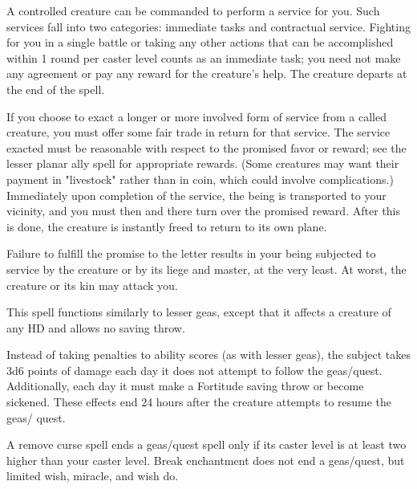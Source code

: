 \begin{multicols}{2}
\begin{small}
{\smallskip\noindent A controlled creature can be commanded to perform a service for you. Such services fall into two categories: immediate tasks and contractual service. Fighting for you in a single battle or taking any other actions that can be accomplished within 1 round per caster level counts as an immediate task; you need not make any agreement or pay any reward for the creature's help. The creature departs at the end of the spell.

\smallskip\noindent If you choose to exact a longer or more involved form of service from a called creature, you must offer some fair trade in return for that service. The service exacted must be reasonable with respect to the promised favor or reward; see the lesser planar ally spell for appropriate rewards. (Some creatures may want their payment in "livestock" rather than in coin, which could involve complications.) Immediately upon completion of the service, the being is transported to your vicinity, and you must then and there turn over the promised reward. After this is done, the creature is instantly freed to return to its own plane.

\smallskip\noindent Failure to fulfill the promise to the letter results in your being subjected to service by the creature or by its liege and master, at the very least. At worst, the creature or its kin may attack you.}


\noindent This spell functions similarly to lesser geas, except that it affects a creature of any HD and allows no saving throw.

\smallskip\noindent Instead of taking penalties to ability scores (as with lesser geas), the subject takes 3d6 points of damage each day it does not attempt to follow the geas/quest. Additionally, each day it must make a Fortitude saving throw or become sickened. These effects end 24 hours after the creature attempts to resume the geas/ quest.

\smallskip\noindent A remove curse spell ends a geas/quest spell only if its caster level is at least two higher than your caster level. Break enchantment does not end a geas/quest, but limited wish, miracle, and wish do.


\end{small}
\end{multicols}
